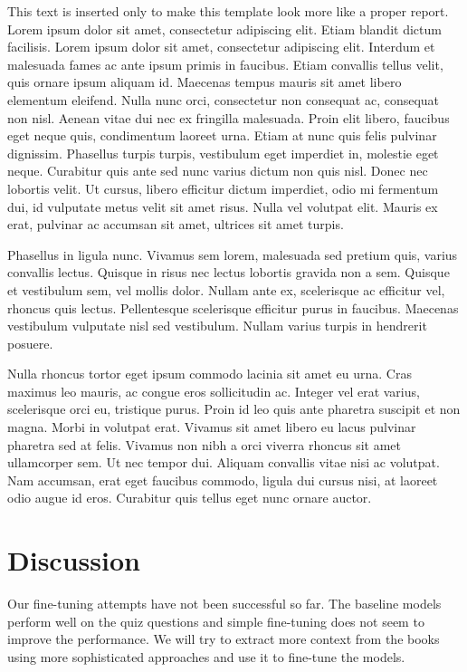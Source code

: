 \documentclass[fleqn,moreauthors,10pt]{ds_report}
\begin{document}
This text is inserted only to make this template look more like a proper report. Lorem ipsum dolor sit amet, consectetur adipiscing elit. Etiam blandit dictum facilisis. Lorem ipsum dolor sit amet, consectetur adipiscing elit. Interdum et malesuada fames ac ante ipsum primis in faucibus. Etiam convallis tellus velit, quis ornare ipsum aliquam id. Maecenas tempus mauris sit amet libero elementum eleifend. Nulla nunc orci, consectetur non consequat ac, consequat non nisl. Aenean vitae dui nec ex fringilla malesuada. Proin elit libero, faucibus eget neque quis, condimentum laoreet urna. Etiam at nunc quis felis pulvinar dignissim. Phasellus turpis turpis, vestibulum eget imperdiet in, molestie eget neque. Curabitur quis ante sed nunc varius dictum non quis nisl. Donec nec lobortis velit. Ut cursus, libero efficitur dictum imperdiet, odio mi fermentum dui, id vulputate metus velit sit amet risus. Nulla vel volutpat elit. Mauris ex erat, pulvinar ac accumsan sit amet, ultrices sit amet turpis.

Phasellus in ligula nunc. Vivamus sem lorem, malesuada sed pretium quis, varius convallis lectus. Quisque in risus nec lectus lobortis gravida non a sem. Quisque et vestibulum sem, vel mollis dolor. Nullam ante ex, scelerisque ac efficitur vel, rhoncus quis lectus. Pellentesque scelerisque efficitur purus in faucibus. Maecenas vestibulum vulputate nisl sed vestibulum. Nullam varius turpis in hendrerit posuere.

Nulla rhoncus tortor eget ipsum commodo lacinia sit amet eu urna. Cras maximus leo mauris, ac congue eros sollicitudin ac. Integer vel erat varius, scelerisque orci eu, tristique purus. Proin id leo quis ante pharetra suscipit et non magna. Morbi in volutpat erat. Vivamus sit amet libero eu lacus pulvinar pharetra sed at felis. Vivamus non nibh a orci viverra rhoncus sit amet ullamcorper sem. Ut nec tempor dui. Aliquam convallis vitae nisi ac volutpat. Nam accumsan, erat eget faucibus commodo, ligula dui cursus nisi, at laoreet odio augue id eros. Curabitur quis tellus eget nunc ornare auctor.



\section*{Discussion}

Our fine-tuning attempts have not been successful so far.
The baseline models perform well on the quiz questions and simple fine-tuning does not seem to improve the performance.
We will try to extract more context from the books using more sophisticated approaches and use it to fine-tune the models.
\end{document}
